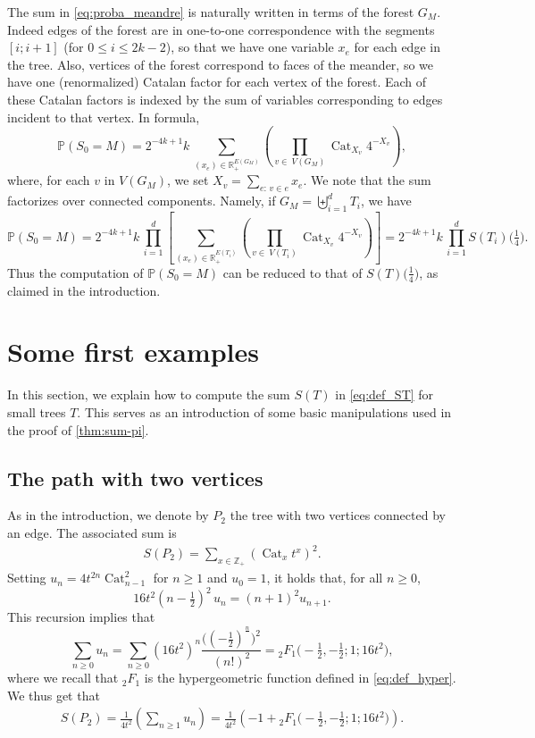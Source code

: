 \documentclass[12pt]{amsart}
\theoremstyle{plain}
\theoremstyle{remark}
\def\P{\mathbb{P}}
\def\Z{\mathbb{Z}}
\DeclareMathOperator{\Cat}{Cat}
\begin{document}
The sum in \eqref{eq:proba_meandre} is naturally written in terms of the forest $G_M$.
Indeed edges of the forest are in one-to-one correspondence with the segments $[i;i+1]$ (for $0\le i \le 2k-2$),
so that we have one variable $x_e$ for each edge in the tree.
Also, vertices of the forest correspond to faces of the meander, so we have one (renormalized) Catalan factor for
each vertex of the forest.
Each of these Catalan factors is indexed by the sum of variables corresponding to edges incident to that vertex.
In formula,
\begin{equation}
  \P (S_0=M) = 2^{-4k+1} k\, \sum_{(x_e) \in \mathbb R_+^{E(G_M)}}  \left( \prod_{v \!\in\ V(G_M)}
  \Cat_{X_v} 4^{- X_v} \right),
 \end{equation}
 where, for each $v$ in $V(G_M)$, we set $X_v=\sum_{e:\, v\in e} x_e$.
We note that the sum factorizes over connected components.
Namely, if $G_M= \biguplus_{i=1}^d T_i$, we have
\begin{equation}
  \P (S_0=M) = 2^{-4k+1} k\, \prod_{i=1}^d \left[ \sum_{(x_e) \in \mathbb R_+^{E(T_i)}}  \left( \prod_{v \!\in\ V(T_i)}
  \Cat_{X_v} 4^{- X_v} \right) \right] = 2^{-4k+1} k\, \prod_{i=1}^d S(T_i)\big(\tfrac14\big).
\end{equation}
Thus the computation of $\P (S_0=M)$ can be reduced to that of $S(T)\big(\tfrac14\big)$,
as claimed in the introduction.

\section{Some first examples}
\label{sec:first_examples}
In this section, we explain how to compute the sum $S(T)$ in \eqref{eq:def_ST} for small trees $T$.
This serves as an introduction of some basic manipulations used in the proof of \cref{thm:sum-pi}.

\subsection{The path with two vertices}
\label{ssec:ex_P2}
As in the introduction, we denote by $P_2$ the tree with two vertices connected by an edge.
The associated sum is 
\begin{align*}
S(P_2) = \sum_{x \in \Z_+} \left( \Cat_x t^{x}\right)^2.
\end{align*}
Setting $u_{n}=4 t^{2n} \Cat_{n-1}^2$ for $n \ge 1$ and $u_0=1$, it holds that, for all $n\ge 0$,
\[16 t^2 (n-\tfrac12)^2\, u_n = (n+1)^2 u_{n+1}. \]
This recursion implies that 
\[ \sum_{n \ge 0} u_n= \sum_{n \ge 0} (16t^2)^n \frac{\big((-\tfrac12)^{\frac{n}{\,} }\big)^2}{(n!)^2} = {}_{2}^{}{{}{{}{F_{1}^{}}}}\big(-\tfrac12,-\tfrac12; 1; 16t^2\big),\]
where we recall that  ${}_{2}^{}{{}{{}{F_{1}^{}}}}$
is the hypergeometric function defined in \eqref{eq:def_hyper}.
We thus get that
\begin{align*}
  S(P_2) = \frac{1}{4t^2}\left( \sum_{n \ge 1} u_n \right) =\frac{1}{4t^2}\left( -1+ {}_{2}^{}{{}{{}{F_{1}^{}}}}\big(-\tfrac12,-\tfrac12; 1; 16t^2\big)\right).
\end{align*}
\end{document}
